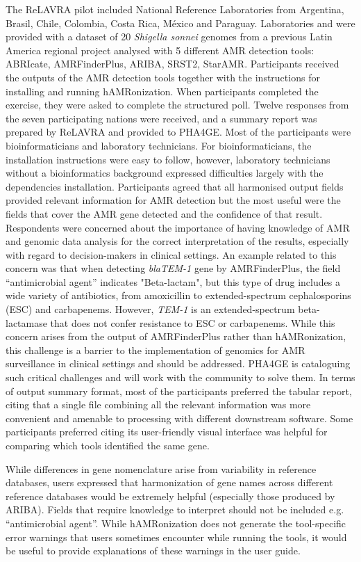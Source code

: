 The ReLAVRA pilot included National Reference Laboratories from Argentina, Brasil, Chile, Colombia, Costa Rica, México and Paraguay. Laboratories and were provided with a dataset of 20 \textit{Shigella sonnei} genomes from a previous Latin America regional project analysed with 5 different AMR detection tools: ABRIcate, AMRFinderPlus, ARIBA, SRST2, StarAMR. Participants received the outputs of the AMR detection tools together with the instructions for installing and running hAMRonization. When participants completed the exercise, they were asked to complete the structured poll. Twelve responses from the seven participating nations were received, and a summary report was prepared by ReLAVRA and provided to PHA4GE. Most of the participants were bioinformaticians and laboratory technicians. For bioinformaticians, the installation instructions were easy to follow, however, laboratory technicians without a bioinformatics background expressed difficulties largely with the dependencies installation. Participants agreed that all harmonised output fields provided relevant information for AMR detection but the most useful were the fields that cover the AMR gene detected and the confidence of that result. Respondents were concerned about the importance of having knowledge of AMR and genomic data analysis for the correct interpretation of the results, especially with regard to decision-makers in clinical settings. An example related to this concern was that when detecting \textit{blaTEM-1} gene by AMRFinderPlus, the field “antimicrobial agent” indicates "Beta-lactam", but this type of drug includes a wide variety of antibiotics, from amoxicillin to extended-spectrum cephalosporins (ESC) and carbapenems. However, \textit{TEM-1} is an extended-spectrum beta-lactamase that does not confer resistance to ESC or carbapenems. While this concern arises from the output of AMRFinderPlus rather than hAMRonization, this challenge is a barrier to the implementation of genomics for AMR surveillance in clinical settings and should be addressed. PHA4GE is cataloguing such critical challenges and will work with the community to solve them. In terms of output summary format, most of the participants preferred the tabular report, citing that a single file combining all the relevant information was more convenient and amenable to processing with different downstream software. Some participants preferred citing its user-friendly visual interface was helpful for comparing which tools identified the same gene.

While differences in gene nomenclature arise from variability in reference databases, users expressed that harmonization of gene names across different reference databases would be extremely helpful (especially those produced by ARIBA). Fields that require knowledge to interpret should not be included e.g. “antimicrobial agent”. While hAMRonization does not generate the tool-specific error warnings that users sometimes encounter while running the tools, it would be useful to provide explanations of these warnings in the user guide. 

